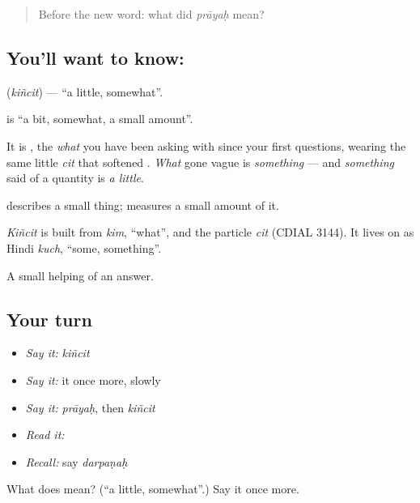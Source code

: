 \label{lesson:SA-C42-a-little}



\begin{quote}
Before the new word: what did \emph{prāyaḥ} mean?
\end{quote}

\subsection*{You'll want to know: }
\textbf{} (\emph{kiñcit}) — \textquotedblleft{}a little, somewhat\textquotedblright{}.

\textbf{} is \textquotedblleft{}a bit, somewhat, a small amount\textquotedblright{}.

It is , the \emph{what} you have been asking with since your first questions, wearing the same little \emph{cit} that softened \textbf{}. \emph{What} gone vague is \emph{something} — and \emph{something} said of a quantity is \emph{a little}.

 describes a small thing; \textbf{} measures a small amount of it.

\begin{cousinweb}
\emph{Kiñcit} is built from \emph{kim}, \textquotedblleft{}what\textquotedblright{}, and the particle \emph{cit} (CDIAL 3144). It lives on as Hindi \emph{kuch}, \textquotedblleft{}some, something\textquotedblright{}.
\end{cousinweb}

\begin{grammarlens}[title={What you've built}]
A small helping of an answer.
\end{grammarlens}

\subsection*{Your turn}
\begin{itemize}
\raggedright
  \item \emph{Say it:} \emph{kiñcit}
  \item \emph{Say it:} it once more, slowly
  \item \emph{Say it:} \emph{prāyaḥ}, then \emph{kiñcit}
  \item \emph{Read it:} \textbf{}
  \item \emph{Recall:} say \emph{darpaṇaḥ}
\end{itemize}

\begin{tcolorbox}[breakable,colback=teal!4,colframe=teal!35!black,title={Before you move on}]
What does  mean? (\textquotedblleft{}a little, somewhat\textquotedblright{}.) Say it once more.
\end{tcolorbox}
